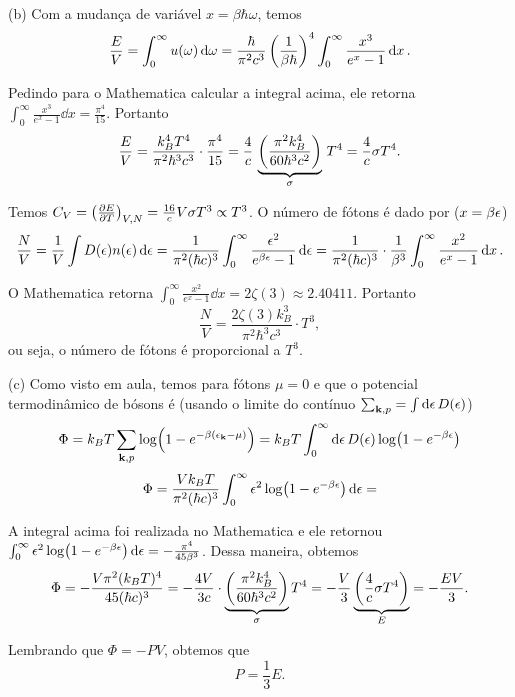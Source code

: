 \documentclass[a4paper,10pt]{article}
\begin{document}
\n\n

(b) Com a mudança de variável $x = \beta \hbar\omega$, temos
$$
\frac{E}{V} = \int_0^\infty u(\omega) \dd{\omega} = \frac{\hbar}{\pi^2 c^3} \,
\qty(\frac{1}{\beta\hbar})^4 \int_0^\infty \frac{x^3}{e^{x} - 1} \dd{x}.
$$

Pedindo para o Mathematica calcular a integral acima, ele retorna $\int_0^\infty \frac{x^3}{e^{x} - 1} \dd{x} = \frac{\pi^4}{15}$. Portanto
$$
\frac{E}{V} = \frac{k_B^4 T^4}{\pi^2 \hbar^3 c^3} \cdot \frac{\pi^4}{15} =
\frac{4}{c} \, \underbrace{\qty(\frac{\pi^2 k_B^4}{60 \hbar^3 c^2})}_{\sigma} \, T^4 = \frac{4}{c} \sigma T^4.
$$

Temos $C_V = \qty(\pdv{E}{T})_{V,N} = \frac{16}{c} V \sigma T^3 \propto T^3$. O número de fótons é dado por ($x = \beta \epsilon$)
$$
\frac{N}{V} = \frac{1}{V} \int D(\epsilon) n(\epsilon) \dd{\epsilon} =
\frac{1}{\pi^2 (\hbar c)^3} \int_0^{\infty} \frac{\epsilon^2}{e^{\beta \epsilon}-1} \dd{\epsilon} =
\frac{1}{\pi^2 (\hbar c)^3} \cdot \frac{1}{\beta^3} \int_0^\infty \frac{x^2}{e^x - 1} \dd{x}.
$$

O Mathematica retorna $\int_0^\infty \frac{x^2}{e^x - 1} \dd{x} = 2 \zeta(3) \approx 2.40411$. Portanto
$$
\frac{N}{V} = \frac{2 \zeta(3) k_B^3}{\pi^2 \hbar^3 c^3} \cdot T^3,
$$
ou seja, o número de fótons é proporcional a $T^3$.

\n\n

(c) Como visto em aula, temos para fótons $\mu = 0$ e que o potencial termodinâmico de bósons é (usando o limite do contínuo $\sum_{\vb{k},p} = \int \dd{\epsilon} D(\epsilon)$)
$$
\Phi = k_B T \sum_{\vb{k},p} \log(1 - e^{-\beta (\epsilon_{\vb{k}} - \mu)}) = k_B T \int_0^{\infty} \dd{\epsilon} D(\epsilon) \log(1 - e^{-\beta \epsilon})
$$
$$
\Phi = \frac{V k_B T}{\pi^2 (\hbar c)^3} \int_0^{\infty} \epsilon^2 \log(1 - e^{-\beta \epsilon}) \dd{\epsilon} =
$$

A integral acima foi realizada no Mathematica e ele retornou $\int_0^{\infty} \epsilon^2 \log(1 - e^{-\beta \epsilon}) \dd{\epsilon} = - \frac{\pi^4}{45 \beta^3}$. Dessa maneira, obtemos
$$
\Phi = -\frac{V \pi^2 (k_B T)^4}{45 (\hbar c)^3} =
- \frac{4 V}{3 c} \cdot \underbrace{\qty(\frac{\pi^2 k_B^4}{60 \hbar^3 c^2})}_{\sigma} T^4 =
- \frac{V}{3} \underbrace{\qty(\frac{4}{c} \sigma T^4)}_{E} = -\frac{E V}{3}.
$$

Lembrando que $\Phi = - PV$, obtemos que
$$
\boxed{ P = \frac{1}{3} E. }
$$

\n\n
\end{document}
